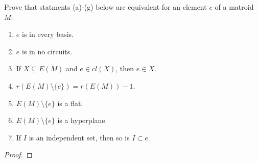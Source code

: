 \prob
{
    Prove that statments (a)-(g) below are equivalent for an element $e$ of a matroid $M$:
    \begin{enumerate}[label=(\alph*)]
        \item $e$ is in every basis.
        \item $e$ is in no circuits.
        \item If $X \subseteq E(M)$ and $e \in cl(X)$, then $e \in X$.
        \item $r(E(M) \setminus \{e\}) = r(E(M)) - 1$.
        \item $E(M) \setminus \{e\}$ is a flat.
        \item $E(M) \setminus \{e\}$ is a hyperplane.
        \item If $I$ is an independent set, then so is $I \subset e$.
    \end{enumerate}
}
\begin{proof}
\end{proof}